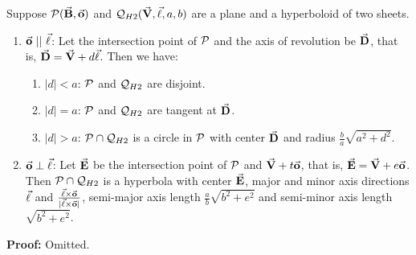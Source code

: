 \begin{lemma}
\label{lemma:hy2-vector-para&perp}
     Suppose ${\cal P}(\vec{\bf B},\vec{\bf o})$ and
${\cal Q}_{H2}(\vec{\bf V},\vec{\bf \ell},a,b)$ are a plane and a hyperboloid of
two sheets.
\begin{enumerate}
     \item $\vec{\bf o}\ ||\ \vec{\bf \ell}$:  Let the intersection point of
          ${\cal P}$ and the axis of revolution be $\vec{\bf D}$, that is,
          $\vec{\bf D}=\vec{\bf V}+d\vec{\bf \ell}$.  Then we have:
     \begin{enumerate}
          \item $|d|<a$: ${\cal P}$ and ${\cal Q}_{H2}$ are disjoint.
          \item $|d|=a$: ${\cal P}$ and ${\cal Q}_{H2}$ are tangent at 
               $\vec{\bf D}$.
          \item $|d|>a$: ${\cal P}\cap{\cal Q}_{H2}$ is a circle in ${\cal P}$
               with center $\vec{\bf D}$ and radius $\frac{b}{a}\sqrt{a^2+d^2}$.
     \end{enumerate}
     \item $\vec{\bf o}\perp\vec{\bf \ell}$: Let $\vec{\bf E}$ be the intersection
          point of ${\cal P}$ and $\vec{\bf V}+t\vec{\bf o}$, that is,
          $\vec{\bf E}=\vec{\bf V}+e\vec{\bf o}$.  
          Then ${\cal P}\cap{\cal Q}_{H2}$ is a hyperbola with center 
          $\vec{\bf E}$, major and minor axis directions $\vec{\bf \ell}$ and 
          $\frac{\vec{\bf \ell}\times\vec{\bf o}}{|\vec{\bf \ell}\times\vec{\bf o}|}$,
          semi-major axis length $\frac{a}{b}\sqrt{b^2+e^2}$ and semi-minor
          axis length $\sqrt{b^2+e^2}$.
\end{enumerate}
\end{lemma}
{\bf Proof:} Omitted. \QED

